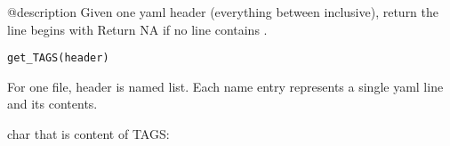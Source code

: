\documentclass[a4paper]{book}
\begin{document}
%
\begin{Description}\relax
@description Given one yaml header (everything between \AsIs{---} inclusive), return the line begins with   Return NA if no line contains .
\end{Description}
%
\begin{Usage}
\begin{verbatim}
get_TAGS(header)
\end{verbatim}
\end{Usage}
%
\begin{Arguments}
\begin{ldescription}
\item[\code{header}] For one file, header is named list. Each name entry represents
a single yaml line and its contents.
\end{ldescription}
\end{Arguments}
%
\begin{Value}
char that is content of TAGS:
\end{Value}
\end{document}
